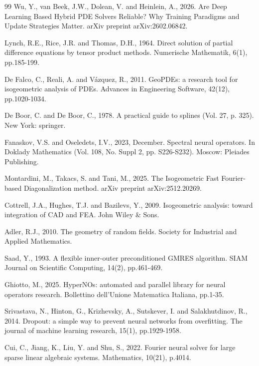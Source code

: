 \documentclass{article}
\theoremstyle{plain}
\numberwithin{equation}{section}
\begin{document}
\begin{thebibliography}{99}
    Wu, Y., van Beek, J.W., Dolean, V. and Heinlein, A., 2026. Are Deep Learning Based Hybrid PDE Solvers Reliable? Why Training Paradigms and Update Strategies Matter. arXiv preprint arXiv:2602.06842.

    Lynch, R.E., Rice, J.R. and Thomas, D.H., 1964. Direct solution of partial difference equations by tensor product methods. Numerische Mathematik, 6(1), pp.185-199.

    De Falco, C., Reali, A. and Vázquez, R., 2011. GeoPDEs: a research tool for isogeometric analysis of PDEs. Advances in Engineering Software, 42(12), pp.1020-1034.

    De Boor, C. and De Boor, C., 1978. A practical guide to splines (Vol. 27, p. 325). New York: springer.

    Fanaskov, V.S. and Oseledets, I.V., 2023, December. Spectral neural operators. In Doklady Mathematics (Vol. 108, No. Suppl 2, pp. S226-S232). Moscow: Pleiades Publishing.

    Montardini, M., Takacs, S. and Tani, M., 2025. The Isogeometric Fast Fourier-based Diagonalization method. arXiv preprint arXiv:2512.20269.

    Cottrell, J.A., Hughes, T.J. and Bazilevs, Y., 2009. Isogeometric analysis: toward integration of CAD and FEA. John Wiley $\&$ Sons.

    Adler, R.J., 2010. The geometry of random fields. Society for Industrial and Applied Mathematics.

    Saad, Y., 1993. A flexible inner-outer preconditioned GMRES algorithm. SIAM Journal on Scientific Computing, 14(2), pp.461-469.

    Ghiotto, M., 2025. HyperNOs: automated and parallel library for neural operators research. Bollettino dell'Unione Matematica Italiana, pp.1-35.

    Srivastava, N., Hinton, G., Krizhevsky, A., Sutskever, I. and Salakhutdinov, R., 2014. Dropout: a simple way to prevent neural networks from overfitting. The journal of machine learning research, 15(1), pp.1929-1958.

    Cui, C., Jiang, K., Liu, Y. and Shu, S., 2022. Fourier neural solver for large sparse linear algebraic systems. Mathematics, 10(21), p.4014.


\end{thebibliography}
\end{document}
